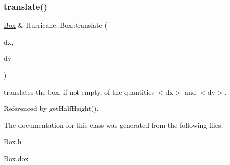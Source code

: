 \subsubsection{\texorpdfstring{translate()}{translate()}}
{\footnotesize\ttfamily \hyperlink{classHurricane_1_1Box}{Box} \& Hurricane\+::\+Box\+::translate (\begin{DoxyParamCaption}\item[{const \hyperlink{group__DbUGroup_ga4fbfa3e8c89347af76c9628ea06c4146}{Db\+U\+::\+Unit} \&}]{dx,  }\item[{const \hyperlink{group__DbUGroup_ga4fbfa3e8c89347af76c9628ea06c4146}{Db\+U\+::\+Unit} \&}]{dy }\end{DoxyParamCaption})}

translates the box, if not empty, of the quantities {\ttfamily $<$dx$>$} and {\ttfamily $<$dy$>$}. 

Referenced by get\+Half\+Height().



The documentation for this class was generated from the following files\+:\begin{DoxyCompactItemize}
\item 
Box.\+h\item 
Box.\+dox\end{DoxyCompactItemize}
